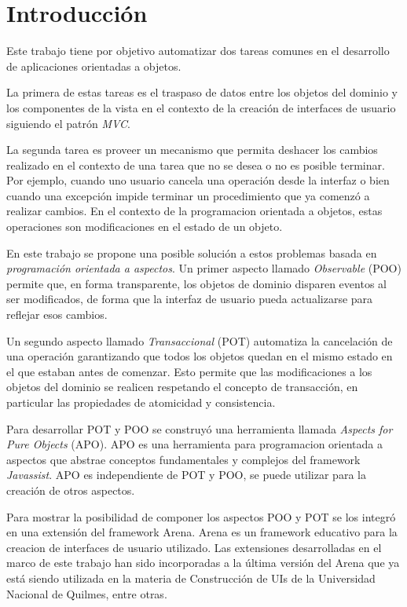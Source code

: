 \section{Introducción}

Este trabajo tiene por objetivo automatizar dos tareas comunes en el
desarrollo de aplicaciones orientadas a objetos.

La primera de estas tareas es el traspaso de datos entre los objetos del dominio
y los componentes de la vista en el contexto de la creación de interfaces de
usuario siguiendo el patrón \emph{MVC}.
 
La segunda tarea es proveer un mecanismo que permita deshacer los cambios
realizado en el contexto de una tarea que no se desea o no es posible terminar.
Por ejemplo, cuando uno usuario cancela una operación desde la interfaz o bien
cuando una excepción impide terminar un procedimiento que ya comenzó a realizar
cambios.
En el contexto de la programacion orientada a objetos, estas operaciones son
modificaciones en el estado de un objeto.

En este trabajo se propone una posible solución a estos problemas basada en
\emph{programación orientada a aspectos}.
Un primer aspecto llamado \emph{Observable} (POO) permite que, en forma
transparente, los objetos de dominio disparen eventos al ser modificados, de
forma que la interfaz de usuario pueda actualizarse para reflejar esos cambios.

Un segundo aspecto llamado \emph{Transaccional} (POT) automatiza la cancelación
de una operación garantizando que todos los objetos quedan en el mismo estado en
el que estaban antes de comenzar. Esto permite que las modificaciones a los
objetos del dominio se realicen respetando el concepto de transacción, en
particular las propiedades de atomicidad y consistencia.

Para desarrollar POT y POO se construyó una herramienta llamada
\emph{Aspects for Pure Objects} (APO).
APO es una herramienta para programacion orientada a aspectos que abstrae
conceptos fundamentales y complejos del framework \emph{Javassist}. 
APO es independiente de POT y POO, se puede utilizar
para la creación de otros aspectos.

Para mostrar la posibilidad de componer los aspectos POO y POT se los integró en
una extensión del framework Arena.
Arena es un framework educativo para la creacion de interfaces de usuario
utilizado.
Las extensiones desarrolladas en el marco de este trabajo han sido incorporadas
a la última versión del Arena que ya está siendo utilizada en la materia de
Construcción de UIs de la Universidad Nacional de Quilmes, entre otras.

